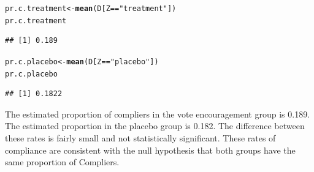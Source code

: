\documentclass[11pt,notitlepage]{article}\usepackage[]{graphicx}\usepackage[]{color}
\makeatletter
\newcommand{\hlstr}[1]{\textcolor[rgb]{0.192,0.494,0.8}{#1}}%
\newcommand{\hlopt}[1]{\textcolor[rgb]{0,0,0}{#1}}%
\newcommand{\hlstd}[1]{\textcolor[rgb]{0.345,0.345,0.345}{#1}}%
\newcommand{\hlkwb}[1]{\textcolor[rgb]{0.69,0.353,0.396}{#1}}%
\newcommand{\hlkwd}[1]{\textcolor[rgb]{0.737,0.353,0.396}{\textbf{#1}}}%
\newenvironment{kframe}{%
 \def\at@end@of@kframe{}%
 \ifinner\ifhmode%
  \def\at@end@of@kframe{\end{minipage}}%
  \begin{minipage}{\columnwidth}%
 \fi\fi%
 \def\FrameCommand##1{\hskip\@totalleftmargin \hskip-\fboxsep
 \colorbox{shadecolor}{##1}\hskip-\fboxsep
     \hskip-\linewidth \hskip-\@totalleftmargin \hskip\columnwidth}%
 \MakeFramed {\advance\hsize-\width
   \@totalleftmargin\z@ \linewidth\hsize
   \@setminipage}}%
 {\par\unskip\endMakeFramed%
 \at@end@of@kframe}
\newenvironment{knitrout}{}{} %
\makeatother
\begin{document}
\begin{enumerate}[a)]
\begin{knitrout}
\begin{kframe}
\begin{alltt}
\hlstd{pr.c.treatment} \hlkwb{<-} \hlkwd{mean}\hlstd{(D[Z}\hlopt{==}\hlstr{"treatment"}\hlstd{])}
\hlstd{pr.c.treatment}
\end{alltt}
\begin{verbatim}
## [1] 0.189
\end{verbatim}
\begin{alltt}
\hlstd{pr.c.placebo} \hlkwb{<-} \hlkwd{mean}\hlstd{(D[Z}\hlopt{==}\hlstr{"placebo"}\hlstd{])}
\hlstd{pr.c.placebo}
\end{alltt}
\begin{verbatim}
## [1] 0.1822
\end{verbatim}
\end{kframe}
\end{knitrout}

The estimated proportion of compliers in the vote encouragement group is 0.189. The estimated proportion in the placebo group is 0.182. The difference between these rates is fairly small and not statistically significant. These rates of compliance are consistent with the null hypothesis that both groups have the same proportion of Compliers.


\end{enumerate}
\end{document}

